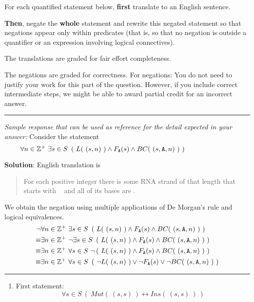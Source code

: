 \begin{enumerate}
   For each quantified statement below, {\bf first} translate to an English sentence.

   {\bf Then}, negate the {\bf whole} statement and rewrite this
   negated statement so that negations appear only within predicates 
   (that is, so that no negation is outside a quantifier or an expression involving logical connectives).
 
    The translations are graded for fair effort completeness.
 
   The negations are graded for correctness. For negations: You do not need to justify 
   your work for this part of the question.  However, if you include correct
   intermediate steps, we might be able to award partial credit for an incorrect answer.
 
  \rule{0.5\textwidth}{.4pt}
 
 {\it Sample response that can be used as reference for the detail expected 
 in your answer:} 
 Consider the statement
 \[
  \hspace{-1in}\forall n \in \mathbb{Z}^+~ \exists s \in S~\left( ~L(~(s,n)~) \land F_\A (s) \land BC(~(s,\A,n)~)~\right)
  \]
  
 {\bf Solution}: English translation is 
 \begin{quote}
 For each positive integer there is some RNA strand of that length that starts 
 with \A~ and all of its bases are \A.
 \end{quote} 
 
 We obtain the negation using multiple applications of De Morgan's rule and logical equivalences. 
 \begin{align*}
 \lnot &\forall n \in \mathbb{Z}^+~ \exists s \in S~\left( ~L(~(s,n)~) \land F_{\texttt{A}} (s) \land BC(~(s,\texttt{A},n)~)~\right) \\
 \equiv&\exists n \in \mathbb{Z}^+~ \lnot \exists s \in S~\left( ~L(~(s,n)~) \land F_{\texttt{A}} (s) \land BC(~(s,\texttt{A},n)~)~\right) \\
 \equiv&\exists n \in \mathbb{Z}^+~ \forall s \in S~\lnot \left( ~L(~(s,n)~) \land F_{\texttt{A}} (s) \land BC(~(s,\texttt{A},n)~)~\right) \\
 \equiv&\exists n \in \mathbb{Z}^+~ \forall s \in S~\left( ~\lnot L(~(s,n)~) \lor \lnot F_{\texttt{A}} (s) \lor \lnot BC(~(s,\texttt{A},n)~)~\right)
 \end{align*}
 
 
 \rule{0.5\textwidth}{.4pt}
 
 
 \begin{enumerate}
 \item  First statement:
 \[
 \forall s \in S ~\left( ~Mut(~(s,s)~) \leftrightarrow Ins(~(s,s)~) ~\right)
 \]
 

\end{enumerate}
\end{enumerate}
